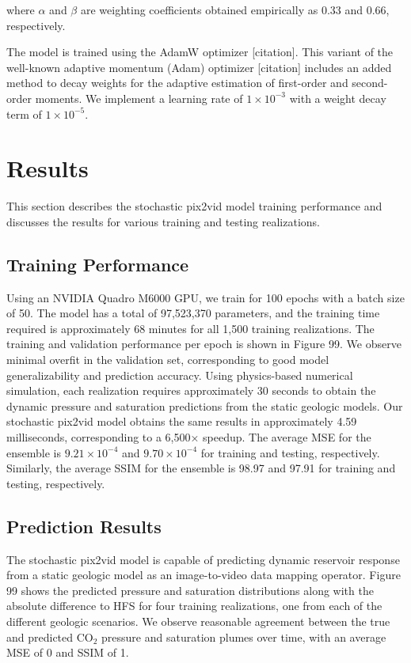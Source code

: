 \documentclass[default,iicol]{sn-jnl}
\begin{document}
where $\alpha$ and $\beta$ are weighting coefficients obtained empirically as 0.33 and 0.66, respectively.

The model is trained using the AdamW optimizer [citation]. This variant of the well-known adaptive momentum (Adam) optimizer [citation] includes an added method to decay weights for the adaptive estimation of first-order and second-order moments. We implement a learning rate of $1\times10^{-3}$ with a weight decay term of $1\times10^{-5}$. 

\section{Results}\label{sec3_results}
This section describes the stochastic pix2vid model training performance and discusses the results for various training and testing realizations.

\subsection{Training Performance}\label{subsec3_train_perf}
Using an NVIDIA Quadro M6000 GPU, we train for 100 epochs with a batch size of 50. The model has a total of 97,523,370 parameters, and the training time required is approximately 68 minutes for all 1,500 training realizations. The training and validation performance per epoch is shown in Figure 99. We observe minimal overfit in the validation set, corresponding to good model generalizability and prediction accuracy. Using physics-based numerical simulation, each realization requires approximately 30 seconds to obtain the dynamic pressure and saturation predictions from the static geologic models. Our stochastic pix2vid model obtains the same results in approximately 4.59 milliseconds, corresponding to a 6,500× speedup. The average MSE for the ensemble is $9.21\times10^{-4}$ and $9.70\times10^{-4}$ for training and testing, respectively. Similarly, the average SSIM for the ensemble is 98.97 and 97.91 for training and testing, respectively.

\subsection{Prediction Results}\label{subsec3_pred_results}
The stochastic pix2vid model is capable of predicting dynamic reservoir response from a static geologic model as an image-to-video data mapping operator. Figure 99 shows the predicted pressure and saturation distributions along with the absolute difference to HFS for four training realizations, one from each of the different geologic scenarios. We observe reasonable agreement between the true and predicted CO$_2$ pressure and saturation plumes over time, with an average MSE of 0 and SSIM of 1. 
\end{document}
